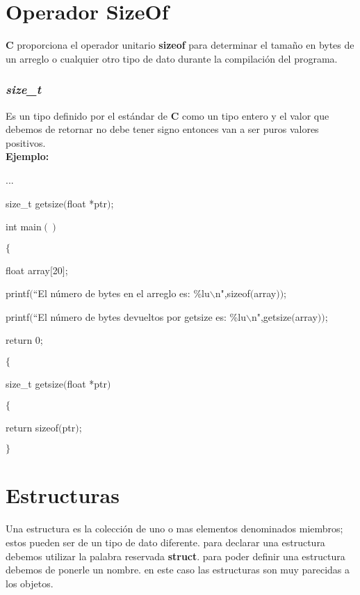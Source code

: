 \documentclass[]{article}
\begin{document}
	
	
	
	

	\section{Operador SizeOf}
	
	\textbf{C} proporciona el operador unitario \textbf{sizeof} para determinar el tamaño en bytes de un arreglo o cualquier otro tipo de dato durante la compilación del programa.
	
	\subsubsection{\textit{size\_t}}
	
	Es un tipo definido por el estándar de \textbf{C} como un tipo entero y el valor que debemos de retornar no debe tener signo entonces van a ser puros valores positivos.\\
	
	\textbf{Ejemplo:\\}
	
	...
	
	size\_t getsize$($float *ptr$)$;
	
	int main$()$
	
	$\lbrace$
	
	float array$\lbrack$20$\rbrack$;
	
	printf$($``El número de bytes en el arreglo es: \%lu$\backslash$n",sizeof$($array$))$;
	
	printf$($``El número de bytes devueltos por getsize es: \%lu$\backslash$n",getsize$($array$))$;
	
	return 0;
	
	$\lbrace$
	
	size\_t getsize$($float *ptr$)$
	
	$\lbrace$
	
	return sizeof$($ptr$)$;
	
	$\rbrace$
	
	\section{Estructuras}
	
	Una estructura es la colección de uno o mas elementos denominados miembros; estos pueden ser de un tipo de dato diferente. para declarar una estructura debemos utilizar la palabra reservada \textbf{struct}. para poder definir una estructura debemos de ponerle un nombre. en este caso las estructuras son muy parecidas a los objetos.\\
	
\end{document}
